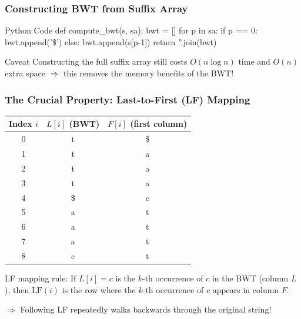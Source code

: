 \documentclass[
11pt, %
aspectratio=169, %
]{beamer}
\begin{document}
\begin{frame}
    \frametitle{Constructing BWT from Suffix Array}

    \begin{block}{Python Code}
    {\ttfamily
    def compute\_bwt(s, sa):\newline
    \quad bwt = []\newline
    \quad for p in sa:\newline
    \quad\quad if p == 0:\newline
    \quad\quad\quad bwt.append('\$')\newline
    \quad\quad else:\newline
    \quad\quad\quad bwt.append(s[p-1])\newline
    \quad return ''.join(bwt)
    }
    \end{block}

    \begin{alertblock}{Caveat}
        Constructing the full suffix array still costs $O(n\log n)$ time 
        and $O(n)$ extra space $\Rightarrow$ this removes the memory benefits of the BWT!
    \end{alertblock}

\end{frame}


\begin{frame}
	\frametitle{The Crucial Property: Last-to-First (LF) Mapping}
	
	\begin{center}
		\begin{tabular}{c|c|c}
			Index $i$ & $L[i]$ (BWT) & $F[i]$ (first column) \\
			\hline
			0 & t & \$ \\
			1 & t & a \\
			2 & t & a \\
			3 & t & a \\
			4 & \$ & c \\
			5 & a & t \\
			6 & a & t \\
			7 & a & t \\
			8 & c & t \\
		\end{tabular}
	\end{center}
	
	\bigskip
	\alert{LF mapping rule:}
	If $L[i] = c$ is the $k$-th occurrence of $c$ in the BWT (column $L$),  
	then $\text{LF}(i)$ is the row where the $k$-th occurrence of $c$ appears in column $F$.
	
	\smallskip
	$\Rightarrow$ Following LF repeatedly walks \alert{backwards} through the original string!
\end{frame}
\end{document}

